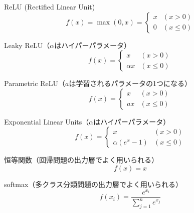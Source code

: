 \documentclass[class=jsarticle, crop=false, dvipdfmx, fleqn]{standalone}
\begin{document}
ReLU (Rectified Linear Unit)
\begin{equation}
f(x) = \max(0, x) = 
	\begin{cases}
		x & (x > 0) \\
		0 & (x \leq 0)
	\end{cases}
\end{equation}

Leaky ReLU（$\alpha$はハイパーパラメータ）
\begin{equation}
f(x) = 
	\begin{cases}
		x & (x > 0) \\
		\alpha x & (x \leq 0)
	\end{cases}
\end{equation}

Parametric ReLU（$a$は学習されるパラメータの1つになる）
\begin{equation}
f(x) = 
	\begin{cases}
		x & (x > 0) \\
		a x & (x \leq 0)
	\end{cases}
\end{equation}

Exponential Linear Units（$\alpha$はハイパーパラメータ）
\begin{equation}
f(x) = 
	\begin{cases}
		x & (x > 0) \\
		\alpha (e^x - 1) & (x \leq 0)
	\end{cases}
\end{equation}

恒等関数（回帰問題の出力層でよく用いられる）
\begin{equation}
f(x) = x
\end{equation}

softmax（多クラス分類問題の出力層でよく用いられる）
\begin{equation}
f(x_i) = \frac{e^{x_i}}{\sum_{j=1}^{n} e^{x_j}}
\end{equation}
\end{document}
